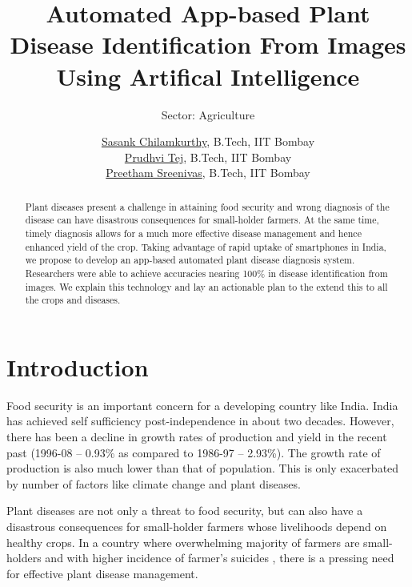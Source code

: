 \documentclass[a4paper]{scrartcl}
\begin{document}
\title{Automated App-based Plant Disease Identification From Images Using Artifical Intelligence}
\subtitle{Sector: Agriculture}
\author{
\href{mailto:sasankchilamkurthy@gmail.com}{Sasank Chilamkurthy}, B.Tech, IIT Bombay\\
\href{mailto:prudhvitej.immadi@gmail.com}{Prudhvi Tej}, B.Tech, IIT Bombay\\
\href{mailto:preethamsreenivas@gmail.com}{Preetham Sreenivas}, B.Tech, IIT Bombay
}

\maketitle

\begin{abstract}
Plant diseases present a challenge in attaining food security and wrong diagnosis of the disease can have disastrous consequences for small-holder farmers. 
At the same time, timely diagnosis allows for a much more effective disease management and hence enhanced yield of the crop.
Taking advantage of rapid uptake of smartphones in India, we propose to develop an app-based automated plant disease diagnosis system. 
Researchers were able to achieve accuracies nearing 100\% in disease identification from images.
We explain this technology and lay an actionable plan to the extend this to all the crops and diseases.


\end{abstract}

\section{Introduction}
Food security is an important concern for a developing country like India.
India has achieved self sufficiency post-independence in about two decades.
However, there has been a decline in growth rates of production and yield in the recent past (1996-08 -- 0.93\% as compared to 1986-97 -- 2.93\%). 
The growth rate of production is also much lower than that of population\cite{dev2010food}.
This is only exacerbated by number of factors like climate change\cite{tai2014threat} and plant diseases\cite{strange2005plant}.

Plant diseases are not only a threat to food security, but can also have a disastrous consequences for small-holder farmers whose livelihoods depend on healthy crops. 
In a country where overwhelming majority of farmers are small-holders\cite{ifad2013smallholders} and with higher incidence of farmer's suicides \cite{mishra2014}, 
there is a pressing need for effective plant disease management.
\end{document}
